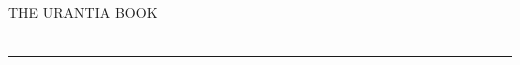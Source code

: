 \newcommand{\subfontsize}{\fontsize{10}{12}\selectfont}

\begin{center}
\booktitlefontsize THE URANTIA BOOK\\[4ex]
\Large\parts\\
\rule{\textwidth}{0.8pt}\\[2ex]
\normalsize\partitxt\\[2ex]
\large\partimix\\[1ex]
\subfontsize\partisub\\[3ex]
\normalsize\partiitxt\\[2ex]
\large\partiimix\\[1ex]
\subfontsize\partiisub\\[3ex]
\normalsize\partiiitxt\\[2ex]
\large\partiiimix\\[1ex]
\subfontsize\partiiisub\\[3ex]
\normalsize\partivtxt\\[2ex]
\large\partivmix\\[1ex]
\subfontsize\partivsub\\[3ex]
\end{center}
